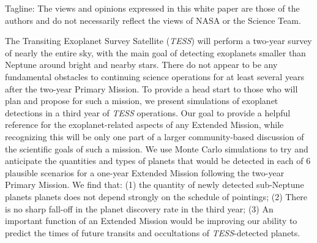 \documentclass{article}
\begin{document}
Tagline: The views and opinions expressed in this white paper are those of the authors and do not necessarily reflect the views of NASA or the \tess Science Team.

The Transiting Exoplanet Survey Satellite (\textit{TESS}) will perform
a two-year survey of nearly the entire sky, with the main goal of detecting
exoplanets smaller than Neptune around bright and nearby stars. There do
not appear to be any fundamental obstacles to continuing science
operations for at least several years after the two-year Primary Mission.
To provide a head start to those who will plan and propose for such a 
mission, we present simulations of exoplanet detections in a third year of \textit{TESS}
operations. Our goal to provide a helpful reference for the exoplanet-related
aspects of any Extended Mission, while recognizing this will be only one part of
a larger community-based discussion of the scientific goals of such a mission.
We use Monte Carlo simulations to try and anticipate the quantities and types
of planets that would be detected in each of 6 plausible scenarios for a
one-year Extended Mission following the two-year Primary Mission.
We find that: (1) the quantity of newly detected sub-Neptune planets
planets does not depend strongly on the schedule of pointings; (2) There is no
sharp fall-off in the planet discovery rate in the third year; (3) An important
function of an Extended Mission would be improving our ability to predict the times of future
transits and occultations of {\it TESS}-detected planets.
\end{document}
